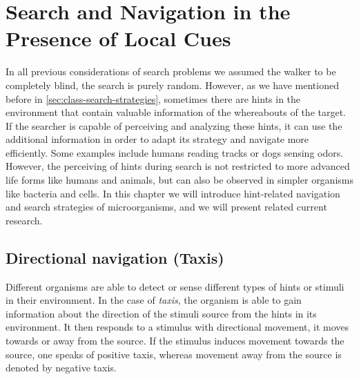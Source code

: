 \chapter{Search and Navigation in the Presence of Local Cues}\label{ch:hints}
In all previous considerations of search problems we assumed the walker to be completely blind, \ie the search is purely random. However, as we have mentioned before in \autoref{sec:class-search-strategies}, sometimes there are hints in the environment that contain valuable information of the whereabouts of the target. If the searcher is capable of perceiving and analyzing these hints, it can use the additional information in order to adapt its strategy and navigate more efficiently. Some examples include \eg humans reading tracks or dogs sensing odors. However, the perceiving of hints during search is not restricted to more advanced life forms like humans and animals, but can also be observed in simpler organisms like bacteria and cells. In this chapter we will introduce hint-related navigation and search strategies of microorganisms, and we will present related current research.

\section{Directional navigation (Taxis)}
Different organisms are able to detect or sense different types of hints or stimuli in their environment. In the case of \textit{taxis}, the organism is able to gain information about the direction of the stimuli source from the hints in its environment. It then responds to a stimulus with directional movement, \ie it moves towards or away from the source. If the stimulus induces movement towards the source, one speaks of positive taxis, whereas movement away from the source is denoted by negative taxis.

